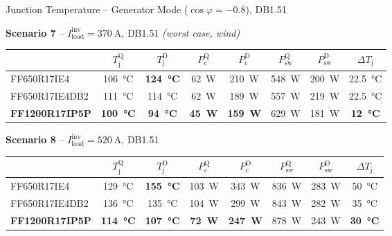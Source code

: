 \documentclass[aspectratio=169, 10pt]{beamer}
\newcommand{\good}[1]{\textcolor{goodgreen}{\textbf{#1}}}
\newcommand{\warn}[1]{\textcolor{warnred}{\textbf{#1}}}
\begin{document}
\begin{frame}{Junction Temperature -- Generator Mode ($\cos\varphi = -0.8$), DB1.51}
  \small
  \renewcommand{\arraystretch}{1.45}

  \textbf{Scenario 7} -- $I_\text{load}^\text{inv} = \SI{370}{\ampere}$, DB1.51 \quad\textit{(worst case, wind)}
  \begin{center}
  \begin{tabular}{l c c c c c c c}
    \toprule
    & $T_\text{j}^\text{Q}$ & $T_\text{j}^\text{D}$ & $P_\text{c}^\text{Q}$ & $P_\text{c}^\text{D}$ & $P_\text{sw}^\text{Q}$ & $P_\text{sw}^\text{D}$ & $\Delta T_\text{j}$ \\
    \midrule
    \rowcolor{rowgray}
    FF650R17IE4    & \SI{106}{\celsius} & \warn{\SI{124}{\celsius}} & \SI{62}{W} & \SI{210}{W} & \SI{548}{W} & \SI{200}{W} & \SI{22.5}{\celsius} \\
    FF650R17IE4DB2 & \SI{111}{\celsius} & \SI{114}{\celsius} & \SI{62}{W} & \SI{189}{W} & \SI{557}{W} & \SI{219}{W} & \SI{22.5}{\celsius} \\
    \rowcolor{rowgray}
    \textbf{FF1200R17IP5P} & \good{\SI{100}{\celsius}} & \good{\SI{94}{\celsius}} & \good{\SI{45}{W}} & \good{\SI{159}{W}} & \SI{629}{W} & \SI{181}{W} & \good{\SI{12}{\celsius}} \\
    \bottomrule
  \end{tabular}
  \end{center}

  \vspace{4pt}
  \textbf{Scenario 8} -- $I_\text{load}^\text{inv} = \SI{520}{\ampere}$, DB1.51
  \begin{center}
  \begin{tabular}{l c c c c c c c}
    \toprule
    & $T_\text{j}^\text{Q}$ & $T_\text{j}^\text{D}$ & $P_\text{c}^\text{Q}$ & $P_\text{c}^\text{D}$ & $P_\text{sw}^\text{Q}$ & $P_\text{sw}^\text{D}$ & $\Delta T_\text{j}$ \\
    \midrule
    \rowcolor{rowgray}
    FF650R17IE4    & \SI{129}{\celsius} & \warn{\SI{155}{\celsius}} & \SI{103}{W} & \SI{343}{W} & \SI{836}{W} & \SI{283}{W} & \SI{50}{\celsius} \\
    FF650R17IE4DB2 & \SI{136}{\celsius} & \SI{135}{\celsius} & \SI{104}{W} & \SI{299}{W} & \SI{843}{W} & \SI{282}{W} & \SI{35}{\celsius} \\
    \rowcolor{rowgray}
    \textbf{FF1200R17IP5P} & \good{\SI{114}{\celsius}} & \good{\SI{107}{\celsius}} & \good{\SI{72}{W}} & \good{\SI{247}{W}} & \SI{878}{W} & \SI{243}{W} & \good{\SI{30}{\celsius}} \\
    \bottomrule
  \end{tabular}
  \end{center}
\end{frame}
\end{document}
